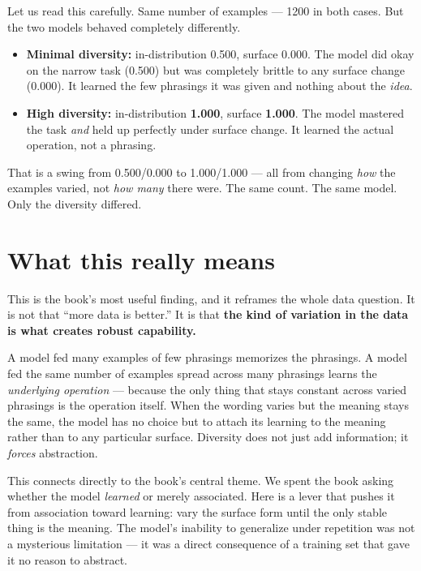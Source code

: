 Let us read this carefully. Same number of examples --- 1200 in both
cases. But the two models behaved completely differently.

\begin{itemize}
\tightlist
\item
  \textbf{Minimal diversity:} in-distribution 0.500, surface 0.000. The
  model did okay on the narrow task (0.500) but was completely brittle
  to any surface change (0.000). It learned the few phrasings it was
  given and nothing about the \emph{idea}.
\item
  \textbf{High diversity:} in-distribution \textbf{1.000}, surface
  \textbf{1.000}. The model mastered the task \emph{and} held up
  perfectly under surface change. It learned the actual operation, not a
  phrasing.
\end{itemize}

That is a swing from 0.500/0.000 to 1.000/1.000 --- all from changing
\emph{how} the examples varied, not \emph{how many} there were. The same
count. The same model. Only the diversity differed.

\section{What this really means}\label{what-this-really-means}

This is the book's most useful finding, and it reframes the whole data
question. It is not that ``more data is better.'' It is that \textbf{the
kind of variation in the data is what creates robust capability.}

A model fed many examples of few phrasings memorizes the phrasings. A
model fed the same number of examples spread across many phrasings
learns the \emph{underlying operation} --- because the only thing that
stays constant across varied phrasings is the operation itself. When the
wording varies but the meaning stays the same, the model has no choice
but to attach its learning to the meaning rather than to any particular
surface. Diversity does not just add information; it \emph{forces}
abstraction.

This connects directly to the book's central theme. We spent the book
asking whether the model \emph{learned} or merely associated. Here is a
lever that pushes it from association toward learning: vary the surface
form until the only stable thing is the meaning. The model's inability
to generalize under repetition was not a mysterious limitation --- it
was a direct consequence of a training set that gave it no reason to
abstract.

